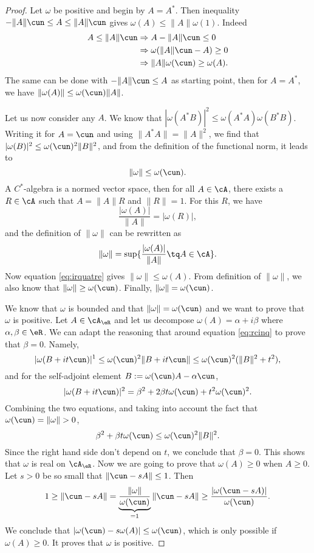 \begin{proof}
	Let $\omega$ be positive and begin by $A=A^*$. Then inequality $-\| A \|\cun\leq A\leq\| A \|\cun$ gives $\omega(A)\leq\| A \|\omega(1)$. Indeed
	\begin{equation}
		\begin{split}
			A\leq\| A \|\cun&\Rightarrow A-\| A \|\cun\leq 0\\
			&\Rightarrow\omega(\| A \|\cun-A)\geq0\\
			&\Rightarrow \| A \|\omega(\cun)\geq\omega(A).
		\end{split}
	\end{equation}
	The same can be done with $-\| A \|\cun\leq A$ as starting point, then for $A=A^*$, we have $\| \omega(A) \|\leq \omega(\cun)\| A \|$.

	Let us now consider any $A$. We know that $| \omega(A^*B) |^2\leq\omega(A^*A)\omega(B^*B)$. Writing it for $A=\cun $ and using $\| A^*A \|=\| A \|^2$, we find that $| \omega(B) |^2\leq\omega(\cun)^2\| B \|^2$,
	and from the definition of the functional norm, it leads to
	\begin{equation} \label{eq:irquatre}
		\| \omega \|\leq\omega(\cun).
	\end{equation}
	A $C^*$-algebra is a normed vector space, then for all $A\in\cA$, there exists a $R\in\cA$ such that $A=\| A \|R$ and $\| R \|=1$. For this $R$, we have
	\[
		\frac{| \omega(A) |}{\| A \|}=| \omega(R) |,
	\]
	and the definition of $\| \omega \|$ can be rewritten as
	\[
		\| \omega \|=\sup\{ \frac{| \omega(A) |}{\| A \|}\tq A\in\cA \}.
	\]
	Now equation \eqref{eq:irquatre} gives $\| \omega \|\leq\omega(A)$. From definition of $\| \omega \|$, we also know that $\| \omega \|\geq \omega(\cun)$. Finally, $\| \omega \|=\omega(\cun)$.


	We know that $\omega$ is bounded and that $\| \omega \|=\omega(\cun)$ and we want to prove that $\omega$ is positive. Let $A\in\cA_{\eR}$ and let us decompose $\omega(A)=\alpha+i\beta$ where $\alpha,\beta\in\eR$. We can adapt the reasoning that around equation \eqref{eq:rcinq} to prove that $\beta=0$. Namely,
	\begin{equation}
		| \omega(B+it\cun) |^1\leq \omega(\cun)^2\| B+it\cun \|
		\leq \omega(\cun)^2(\| B \|^2+t^2),
	\end{equation}
	and for the self-adjoint element $B:=\omega(\cun)A-\alpha\cun$,
	\[
		| \omega(B+it\cun) |^2=\beta^2+2\beta t\omega(\cun)+t^2\omega(\cun)^2.
	\]
	Combining the two equations, and taking into account the fact that $\omega(\cun)=\| \omega \|>0$,
	\[
		\beta^2+\beta t\omega(\cun)\leq\omega(\cun)^2\| B \|^2.
	\]
	Since the right hand side don't depend on $t$, we conclude that $\beta=0$. This shows that $\omega$ is real on $\cA_{\eR}$. Now we are going to prove that $\omega(A)\geq 0$ when $A\geq 0$. Let $s>0$ be so small that $\| \cun-sA \|\leq 1$. Then
	\[
		1\geq\| \cun-sA \|=\underbrace{\frac{\| \omega \|}{\omega(\cun)}}_{=1}\| \cun-sA \|\geq \frac{| \omega(\cun-sA) |}{\omega(\cun)}.
	\]
	We conclude that $| \omega(\cun)-s\omega(A) |\leq\omega(\cun)$, which is only possible if $\omega(A)\geq 0$. It proves that $\omega$ is positive.


\end{proof}
